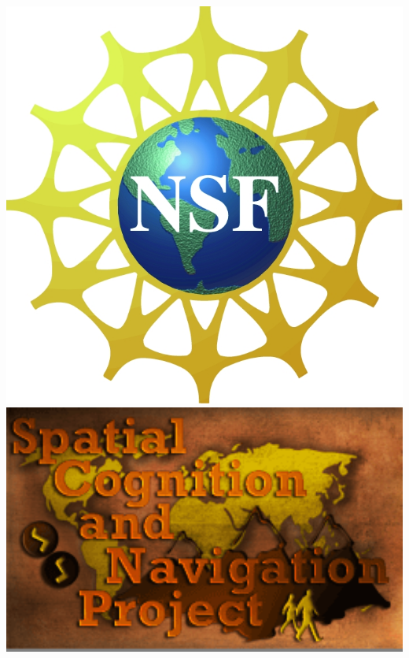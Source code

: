 \documentclass{beamer}
\begin{document}
\begin{frame}
\begin{columns}
\begin{column}{.2\textwidth}
\includegraphics[width= 1\textwidth]{NSF_logo}\\
\vspace{0.75cm} 
\includegraphics[width= 1\textwidth]{SCAN_logo}
\end{column}
\end{columns}

\end{frame}

\end{document}
